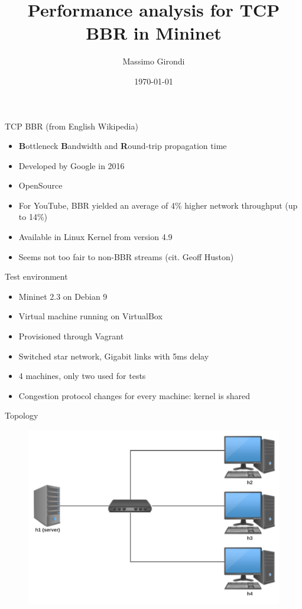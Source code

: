 \documentclass[13pt,aspectratio=43]{beamer}
\title{
	Performance analysis for TCP BBR in Mininet
}
\date{\today}
\author{Massimo Girondi}
\begin{document}
\maketitle

\begin{frame}{TCP BBR (from English Wikipedia)}
	\begin{itemize}
		\item \textbf{B}ottleneck \textbf{B}andwidth and \textbf{R}ound-trip propagation time
		\item Developed by Google in 2016
		\item OpenSource
		\item For YouTube, BBR yielded an average of 4\% higher network throughput (up to 14\%)
		\item Available in Linux Kernel from version 4.9
		\item Seems not too fair to non-BBR streams (cit. Geoff Huston)
	\end{itemize}
\end{frame}

\begin{frame}{Test environment}
	\begin{itemize}
		\item Mininet 2.3 on Debian 9
		\item Virtual machine running on VirtualBox
		\item Provisioned through Vagrant 
		\item Switched star network, Gigabit links with 5ms delay
        \item 4 machines, only two used for tests
		\item Congestion protocol changes for every machine: kernel is shared
	\end{itemize}
\end{frame}
\begin{frame}{Topology}
  \begin{figure}
	  \includegraphics[width=\textwidth,height=\textheight,keepaspectratio]{network.pdf}
  \end{figure}
\end{frame}
\end{document}
